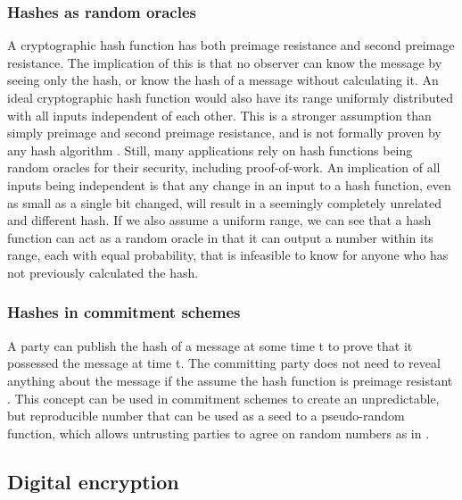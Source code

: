 \subsubsection{Hashes as random oracles}
A cryptographic hash function has both preimage resistance and second preimage resistance. The implication of this is that no observer can know the message by seeing only the hash, or know the hash of a message without calculating it. An ideal cryptographic hash function would also have its range uniformly distributed with all inputs independent of each other. This is a stronger assumption than simply preimage and second preimage resistance, and is not formally proven by any hash algorithm \cite[p.~179-181]{lindell2014introduction}. Still, many applications rely on hash functions being random oracles for their security, including proof-of-work. An implication of all inputs being independent is that any change in an input to a hash function, even as small as a single bit changed, will result in a seemingly completely unrelated and different hash. If we also assume a uniform range, we can see that a hash function can act as a random oracle in that it can output a number within its range, each with equal probability, that is infeasible to know for anyone who has not previously calculated the hash. 

\subsubsection{Hashes in commitment schemes}
A party can publish the hash of a message at some time t to prove that it possessed the message at time t. The committing party does not need to reveal anything about the message if the assume the hash function is preimage resistant \cite[p.~187--189]{lindell2014introduction}. This concept can be used in commitment schemes \cite{brassard1988minimum} to create an unpredictable, but reproducible number that can be used as a seed to a pseudo-random function, which allows untrusting parties to agree on random numbers as in \cite{blum1983coin}.


\subsection{Digital encryption}

